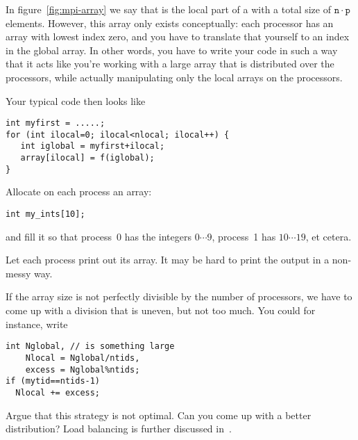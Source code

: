 In figure~\ref{fig:mpi-array} we
say that  is the local part
of a  with a total size of
$\mathtt{n}\cdot\mathtt{p}$
elements.
However, this array only exists
conceptually: each processor has an array with lowest index zero,
and you have to translate that yourself to an index in the global
array.
In other words, you have to write your code in such a way that
it acts like you're working with a large array that is distributed
over the processors, while
actually manipulating only the local arrays on the processors.


Your typical code then looks like

\begin{lstlisting}
int myfirst = .....;
for (int ilocal=0; ilocal<nlocal; ilocal++) {
   int iglobal = myfirst+ilocal;
   array[ilocal] = f(iglobal);
}
\end{lstlisting}

\begin{exercise}
  \label{ex:array-ints}
  Allocate on each process an array:
\begin{lstlisting}
int my_ints[10];    
\end{lstlisting}
and fill it so that process~0 has the integers $0\cdots 9$, process~1 has $10\cdots 19$,
et cetera.

Let each process print out its array.
It may be hard to print the output in a non-messy way.
\end{exercise}

If the array size is not perfectly divisible by the number of processors,
we have to come up with a division that is uneven, but not too much.
You could for instance, write

\begin{lstlisting}
int Nglobal, // is something large
    Nlocal = Nglobal/ntids,
    excess = Nglobal%ntids;
if (mytid==ntids-1) 
  Nlocal += excess;
\end{lstlisting}

\begin{exercise}
  Argue that this strategy is not optimal. Can you come up with a
  better distribution?
  Load balancing is further discussed in~.
\end{exercise}

\begin{comment}
  \begin{exercise}
    \label{ex:inproduct}
    Implement an inner product routine: let $x$ be a
    distributed vector of size~$N$ with elements $x[i]=i$,
    and compute~$x^tx$.
    As before, the right value is $(2N^3+3N^2+N)/6$.

    Use the inner product value to scale to vector so that it has
    norm~1.
    Check that your computation is correct.
  \end{exercise}
\end{comment}

